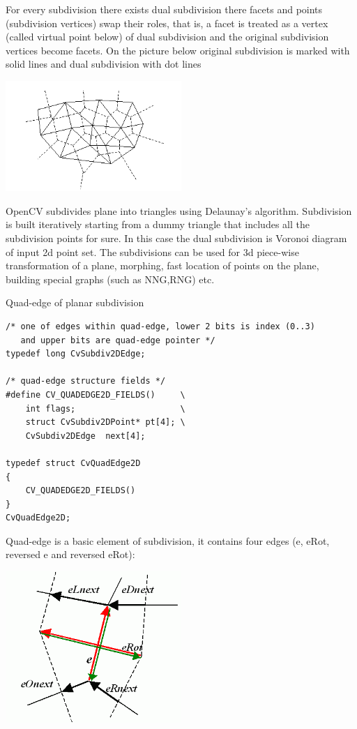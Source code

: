 For every subdivision there exists dual subdivision there facets and
points (subdivision vertices) swap their roles, that is, a facet is
treated as a vertex (called virtual point below) of dual subdivision and
the original subdivision vertices become facets. On the picture below
original subdivision is marked with solid lines and dual subdivision
with dot lines

\includegraphics[width=0.5\textwidth]{pics/subdiv.png}

OpenCV subdivides plane into triangles using Delaunay's
algorithm. Subdivision is built iteratively starting from a dummy
triangle that includes all the subdivision points for sure. In this
case the dual subdivision is Voronoi diagram of input 2d point set. The
subdivisions can be used for 3d piece-wise transformation of a plane,
morphing, fast location of points on the plane, building special graphs
(such as NNG,RNG) etc.

\label{CvQuadEdge2D}

Quad-edge of planar subdivision

\begin{lstlisting}
/* one of edges within quad-edge, lower 2 bits is index (0..3)
   and upper bits are quad-edge pointer */
typedef long CvSubdiv2DEdge;

/* quad-edge structure fields */
#define CV_QUADEDGE2D_FIELDS()     \
    int flags;                     \
    struct CvSubdiv2DPoint* pt[4]; \
    CvSubdiv2DEdge  next[4];

typedef struct CvQuadEdge2D
{
    CV_QUADEDGE2D_FIELDS()
}
CvQuadEdge2D;

\end{lstlisting}

Quad-edge is a basic element of subdivision, it contains four edges (e, eRot, reversed e and reversed eRot):

\includegraphics[width=0.5\textwidth]{pics/quadedge.png}


